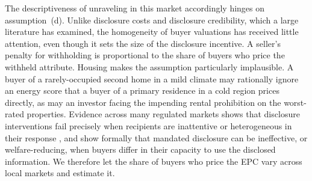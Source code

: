 The descriptiveness of unraveling in this market accordingly hinges on assumption~(d).
Unlike disclosure costs and disclosure credibility, which a large literature has examined,
the homogeneity of buyer valuations has received little attention, even though it sets the size of
the disclosure incentive. A seller's penalty for withholding is proportional to the share of
buyers who price the withheld attribute. Housing makes the
assumption particularly implausible. A buyer of a rarely-occupied second home in a mild climate
may rationally ignore an energy score that a buyer of a primary residence in a cold region
prices directly, as may an investor facing the impending rental prohibition on the worst-rated
properties. Evidence across many regulated markets shows that disclosure interventions fail
precisely when recipients are inattentive or heterogeneous in their response
\citep{loewenstein_disclosure_2014, benshahar_failure_2011}, and
\citet{fishman_mandatory_2003} show formally that mandated disclosure can be ineffective, or
welfare-reducing, when buyers differ in their capacity to use the disclosed information. We
therefore let the share of buyers who price the EPC vary across local markets and estimate it.

